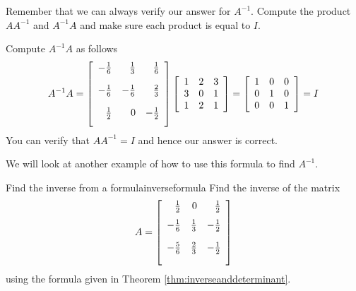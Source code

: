 \begin{solution}
Remember that we can always verify our answer for $A^{-1}$. Compute the product $AA^{-1}$ and $A^{-1}A$ and make
sure each product is equal to $I$.

Compute $A^{-1}A$ as follows
\begin{equation*}
A^{-1}A = 
\allowbreak \leftB
\begin{array}{rrr}
-\vspace{0.05in}\frac{1}{6} & \vspace{0.05in}\frac{1}{3} & \vspace{0.05in}
\frac{1}{6} \\
-\vspace{0.05in}\frac{1}{6} & -\vspace{0.05in}\frac{1}{6} & \vspace{0.05in}
\frac{2}{3} \\
\vspace{0.05in}\frac{1}{2} & 0 & -\vspace{0.05in}\frac{1}{2}
\end{array}
\rightB \leftB
\begin{array}{rrr}
1 & 2 & 3 \\
3 & 0 & 1 \\
1 & 2 & 1
\end{array}
\rightB = \leftB
\begin{array}{rrr}
1 & 0 & 0 \\
0 & 1 & 0 \\
0 & 0 & 1
\end{array}
\rightB
=
I
\end{equation*}
You can verify that $AA^{-1} = I$ and hence our answer is correct. 
\end{solution} 

We will look at another example of how to use this formula to find $A^{-1}$.

\begin{example}{Find the inverse from a formula}{inverseformula}
Find the inverse of the matrix
\begin{equation*}
A=\leftB
\begin{array}{rrr}
\vspace{0.05in}\frac{1}{2} & 0 & \vspace{0.05in}\frac{1}{2} \\
-\vspace{0.05in}\frac{1}{6} & \vspace{0.05in}\frac{1}{3} & -\vspace{0.05in}
\frac{1}{2} \\
-\vspace{0.05in}\frac{5}{6} & \vspace{0.05in}\frac{2}{3} & -\vspace{0.05in}
\frac{1}{2}
\end{array}
\rightB
\end{equation*}
using the formula given in Theorem \ref{thm:inverseanddeterminant}.
\end{example}

